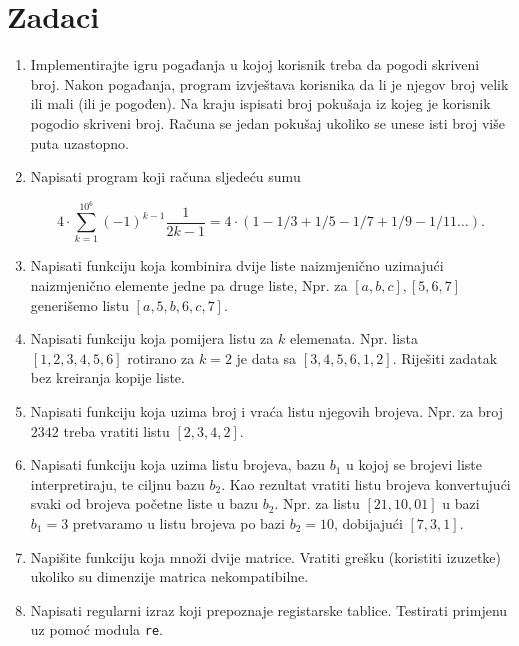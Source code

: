 \section{Zadaci}
\begin{enumerate}
    
    \item Implementirajte igru pogađanja u kojoj korisnik treba da pogodi skriveni broj. Nakon pogađanja, program izvještava korisnika da li je njegov broj velik ili mali (ili je pogođen). Na kraju ispisati broj  pokušaja iz kojeg je korisnik pogodio skriveni broj. Računa se jedan pokušaj ukoliko se unese isti broj više puta uzastopno.
    
    
	\item Napisati program koji računa sljedeću sumu  
	
	$$ 4 \cdot \sum_{k=1}^{10^6}(-1)^{k-1} \frac{1}{2k-1}= 4 \cdot (1-1/3 + 1/5-1/7+1/9-1/11 \ldots).$$
	
	\item Napisati funkciju koja kombinira dvije liste naizmjenično uzimajući naizmjenično elemente jedne pa druge liste, Npr. za $[a,b,c], [5, 6, 7]$ generišemo listu $[a,5,b,6,c,7]$.
	
	\item Napisati funkciju koja pomijera listu za $k$ elemenata. Npr. lista  $[1,2,3,4,5,6]$ rotirano za $k=2$ je data sa $[3,4,5,6,1,2]$. Riješiti zadatak bez kreiranja kopije liste. 
	
	\item Napisati funkciju koja uzima broj i vraća listu njegovih brojeva. Npr. za broj $2342$ treba vratiti listu $[2,3,4,2]$.
	
	\item Napisati funkciju koja uzima listu brojeva,   bazu $b_1$ u kojoj se brojevi liste interpretiraju, te ciljnu bazu $b_2$.  Kao rezultat vratiti listu brojeva konvertujući svaki od brojeva početne liste u bazu $b_2$. Npr. za listu $[21,10,01]$ u bazi $b_1 = 3$ pretvaramo u listu brojeva po bazi $b_2=10$, dobijajući $[7,3, 1]$.
	
	\item Napišite funkciju koja množi dvije matrice. Vratiti grešku (koristiti izuzetke) ukoliko su dimenzije matrica nekompatibilne.  
	 
	\item Napisati regularni izraz koji prepoznaje registarske tablice. Testirati primjenu uz pomoć modula \texttt{re}.
	

\end{enumerate}
